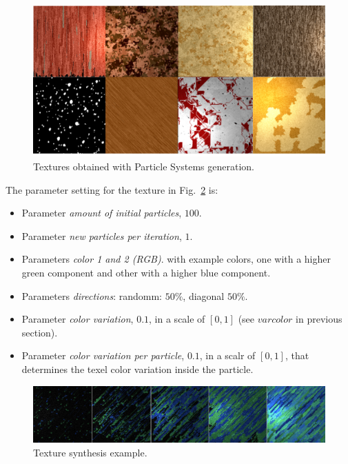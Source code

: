 \begin{figure}[t!]
\centering
\includegraphics[scale=0.18]{resultados}
\caption{Textures obtained with Particle Systems generation.}
\label{resultados}
\end{figure}

The parameter setting for the texture in Fig.~\ref{sintesis} is:

\begin{itemize}
\item Parameter {\em amount of initial particles}, $100$.
\item Parameter {\em new particles per iteration}, $1$.
\item Parameters {\em color 1 and 2 (RGB)}. with example colors, one with a higher green component and other with a higher blue component.
\item Parameters {\em directions}: randomm: $50\%$, diagonal $50\%$.
\item Parameter {\em color variation}, $0.1$, in a scale of $[0,1]$ (see $varcolor$ in previous section).
\item Parameter {\em color variation per particle}, $0.1$, in a scalr of $[0,1]$, that determines the texel color variation inside the particle.
\end{itemize}

\begin{figure}[t!]
\centering
\includegraphics[scale=0.12]{sintesis}
\caption{Texture synthesis example.}
\label{sintesis}
\end{figure}

